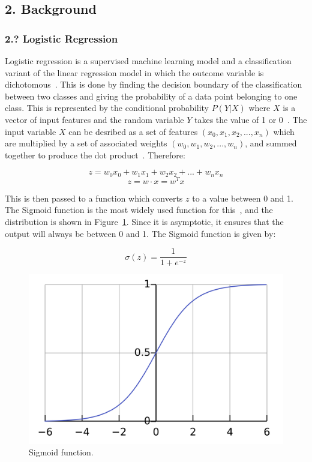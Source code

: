 \documentclass[12pt]{article}
\begin{document}
\newpage
\subsection*{2. Background}
\subsubsection*{2.? Logistic Regression}
Logistic regression is a supervised machine learning model and a classification variant of the linear regression model in which the outcome variable is dichotomous~\cite{Zou2019}. This is done by finding the decision boundary of the classification between two classes and giving the probability of a data point belonging to one class. This is represented by the conditional probability \(P(Y|X)\) where \(X\) is a vector of input features and the random variable \(Y\) takes the value of 1 or 0~\cite{Li2024}. The input variable \(X\) can be desribed as a set of features \((x_0, x_1, x_2, ..., x_n)\) which are multiplied by a set of associated weights \((w_0, w_1, w_2, ..., w_n)\), and summed together to produce the dot product~\cite{Zou2019}. Therefore:

\[z = w_{0}x_{0}+ w_{1}x_{1} + w_{2}x_{2} + ... + w_{n}x_{n}\]
\[z = w \cdot x = w^{T}x\]

This is then passed to a function which converts \(z\) to a value between 0 and 1. The Sigmoid function is the most widely used function for this~\cite{Zou2019}, and the distribution is shown in Figure~\ref{fig:sigmoid}. Since it is asymptotic, it ensures that the output will always be between 0 and 1. The Sigmoid function is given by:

\[\sigma(z) = \frac{1}{1 + e^{-z}}\]

\begin{figure} [H]
  \centering
  \includegraphics[width=0.7\linewidth]{sigmoid}
  \caption{Sigmoid function.}\label{fig:sigmoid}
\end{figure}  
\end{document}
